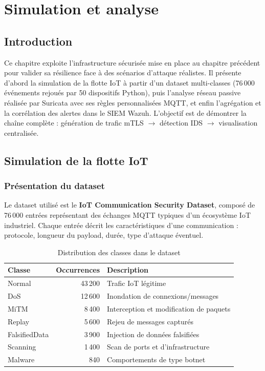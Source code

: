 \chapter{Simulation et analyse}
\label{chap:simulation}

\section{Introduction}

Ce chapitre exploite l'infrastructure sécurisée mise en place au chapitre précédent pour valider sa résilience face à des scénarios d'attaque réalistes. Il présente d'abord la simulation de la flotte IoT à partir d'un dataset multi-classes (76\,000 événements rejoués par 50 dispositifs Python), puis l'analyse réseau passive réalisée par Suricata avec ses règles personnalisées MQTT, et enfin l'agrégation et la corrélation des alertes dans le SIEM Wazuh. L'objectif est de démontrer la chaîne complète : génération de trafic mTLS $\to$ détection IDS $\to$ visualisation centralisée.

\section{Simulation de la flotte IoT}

\subsection{Présentation du dataset}

Le dataset utilisé est le \textbf{IoT Communication Security Dataset}, composé de 76\,000 entrées représentant des échanges MQTT typiques d'un écosystème IoT industriel. Chaque entrée décrit les caractéristiques d'une communication : protocole, longueur du payload, durée, type d'attaque éventuel.

\begin{table}[H]
\centering
\caption{Distribution des classes dans le dataset}
\label{tab:dataset_classes}
\begin{tabular}{lrl}
\toprule
\textbf{Classe} & \textbf{Occurrences} & \textbf{Description} \\
\midrule
Normal & 43\,200 & Trafic IoT légitime \\
DoS & 12\,600 & Inondation de connexions/messages \\
MiTM & 8\,400 & Interception et modification de paquets \\
Replay & 5\,600 & Rejeu de messages capturés \\
FalsifiedData & 3\,900 & Injection de données falsifiées \\
Scanning & 1\,400 & Scan de ports et d'infrastructure \\
Malware & 840 & Comportements de type botnet \\
\bottomrule
\end{tabular}
\end{table}


